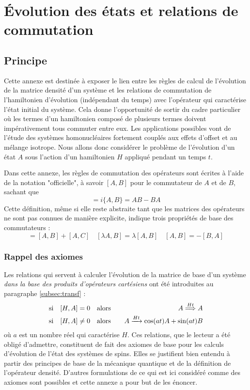 \chapter{Évolution des états et relations de commutation}
\label{chap:hamilt}

\section{Principe}
Cette annexe est destinée à exposer le lien entre les règles de calcul
de l'évolution de la matrice densité d'un système et les
relations de commutation de l'hamiltonien d'évolution
(indépendant du temps) avec l'opérateur qui caractérise l'état initial du système.
Cela donne l'opportunité de sortir du cadre particulier
où les termes d'un hamiltonien composé de plusieurs termes doivent
impérativement tous commuter entre eux.
Les applications possibles vont de l'étude des systèmes homonucléaires
fortement couplés aux effets d'offset et au mélange isotrope.
Nous allons donc considérer le problème de l'évolution
d'un état $A$ sous l'action d'un hamiltonien $H$ appliqué
pendant un temps $t$.

Dans cette annexe, les règles de commutation des opérateurs sont écrites à l'aide de
la notation "officielle", à savoir $[A,B]$ pour le commutateur de $A$ et de $B$,
sachant que
\begin{equation}
[A,B] = i\{A,B\} = AB - BA
\end{equation}
Cette définition, même si elle reste abstraite tant que les matrices des opérateurs
ne sont pas connues de manière explicite, indique trois propriétés de base des commutateurs :
\begin{equation}
[A,B+C] = [A,B] + [A,C] \quad [\lambda A,B] = \lambda[A,B] \quad [A,B] = -[B,A]
\end{equation}

\subsection{Rappel des axiomes}
Les relations qui servent à calculer l'évolution de la matrice de base
d'un système 
\emph{dans la base des produits d'opérateurs cartésiens}
ont été introduites au paragraphe \ref{subsec:transf} :
\begin{eqnarray}
\label{eqn:rien}
\mbox{si}\quad [H,A] = 0 & \quad \mbox{alors} \quad & 
A \stackrel{Ht}{\Longrightarrow} A \\
\label{eqn:evolcart}
\mbox{si}\quad [H,A] \ne 0 & \quad \mbox{alors} \quad & 
A \xrightarrow{Ht} \cos(at)A + \sin(at)B
\end{eqnarray}
où $a$ est un nombre réel qui caractérise $H$.
Ces relations, que le lecteur a été obligé d'admettre, constituent de fait
des axiomes de base pour les calculs d'évolution de l'état des
systèmes de spins.
Elles se justifient bien entendu à partir des principes de
base de la mécanique quantique et de la définition de l'opérateur densité.
D'autres formulations de ce qui est ici considéré comme des
axiomes sont possibles et cette annexe
a pour but de les énoncer.

